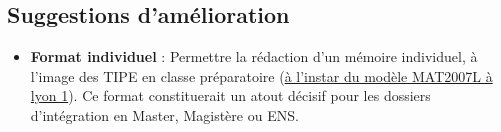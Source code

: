 \documentclass[a4paper,12pt]{article}
\begin{document}
\subsection*{Suggestions d'amélioration}

\begin{itemize}[label=\textbullet]
    \item \textbf{Format individuel} : Permettre la rédaction d'un mémoire individuel, à l'image des TIPE en classe préparatoire (\href{https://licence-math.univ-lyon1.fr/doku.php?id=tipe:page}{à l'instar du modèle MAT2007L à lyon 1}). Ce format constituerait un atout décisif pour les dossiers d'intégration en Master, Magistère ou ENS.
\end{itemize}
\end{document}
